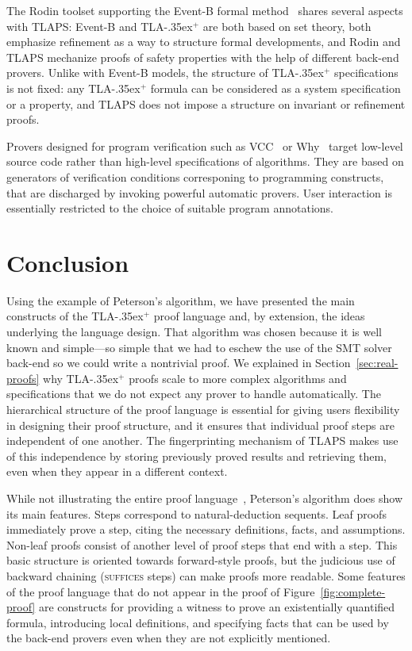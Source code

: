 \documentclass[a4paper]{llncs}
\newcommand{\tlaplus}{\mbox{TLA\kern -.35ex$^+$}\xspace}
\begin{document}
The Rodin toolset supporting the Event-B formal method~\cite{abrial:rodin}
shares several aspects with TLAPS: 
Event-B and \tlaplus are both based on set theory, both
emphasize refinement as a way to structure formal developments, and Rodin and
TLAPS mechanize proofs of safety properties with the help of different back-end
provers. Unlike with Event-B models, the structure of \tlaplus specifications is
not fixed: any \tlaplus formula can be considered as a system specification or a
property, and TLAPS does not impose a structure on invariant or refinement
proofs.

Provers designed for program verification such as VCC~\cite{cohen:vcc} or
Why~\cite{herms:certified} target low-level source code rather
than high-level specifications of algorithms. They are based on generators of
verification conditions corresponing to programming constructs, that are
discharged by invoking powerful automatic provers. User interaction is
essentially restricted to the choice of suitable program annotations.



\section{Conclusion}
\label{sec:conclusion}

Using the example of Peterson's algorithm, we have presented the main constructs
of the \tlaplus proof language and, by extension, the ideas underlying the
language design.
That algorithm was chosen because it is well known and simple---so simple that
we had to eschew the use of the SMT solver back-end so we could write a
nontrivial proof. We explained in Section~\ref{sec:real-proofs} why \tlaplus proofs scale
to more complex algorithms and specifications that we do not expect any prover to
handle automatically.
% 
The hierarchical structure of the proof language is essential for giving users
flexibility in designing their proof structure, and it ensures that individual
proof steps are independent of one another. The fingerprinting mechanism of
TLAPS makes use of this independence by storing previously proved results and
retrieving them, even when they appear in a different context.

While not illustrating  the entire proof language~\cite{lamport:tla+2},
Peterson's algorithm does show its main features. Steps correspond to
natural-deduction sequents.
Leaf proofs immediately prove a step, citing the necessary
definitions, facts, and assumptions. Non-leaf proofs consist of another level of
proof steps that end with a \QED step.
This basic structure is oriented towards forward-style
proofs, but the judicious use of backward chaining (\textsc{suffices} steps)
can make proofs more readable. Some features of the proof language
that do not appear in the proof of Figure~\ref{fig:complete-proof} are constructs
for providing a witness to prove an existentially quantified formula,
introducing local definitions, and specifying facts that can be used by the
back-end provers even when they are not explicitly mentioned.
\end{document}
